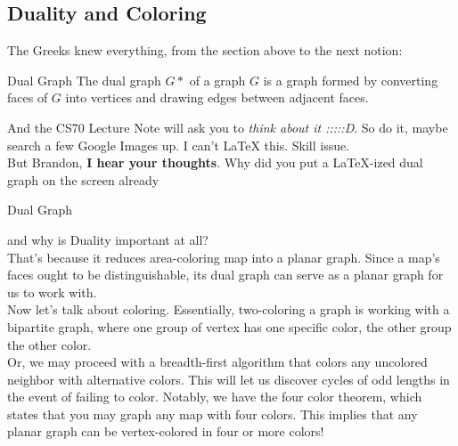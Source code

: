 \subsection{Duality and Coloring}
The Greeks knew everything, from the section above to the next notion:
\begin{ln-define}{Dual Graph}{}
    The dual graph $G*$ of a graph $G$ is a graph formed by converting faces of $G$ into vertices and drawing edges between adjacent faces.
\end{ln-define}
And the CS70 Lecture Note will ask you to \textit{think about it :::::D}. So do it, maybe search a few Google Images up. I can't LaTeX this. Skill issue. \\
But Brandon, \textbf{I hear your thoughts}. Why did you put a LaTeX-ized dual graph on the screen already
\begin{ln-fig}{Dual Graph}{}
    \begin{center}
    \end{center}
\end{ln-fig}
and why is Duality important at all? \\
That's because it reduces area-coloring map into a planar graph. Since a map's faces ought to be distinguishable, its dual graph can serve as a planar graph for us to work with. \\
Now let's talk about coloring. Essentially, two-coloring a graph is working with a bipartite graph, where one group of vertex has one specific color, the other group the other color. \\
Or, we may proceed with a breadth-first algorithm that colors any uncolored neighbor with alternative colors. This will let us discover cycles of odd lengths in the event of failing to color.
Notably, we have the four color theorem, which states that you may graph any map with four colors. This implies that any planar graph can be vertex-colored in four or more colors!

